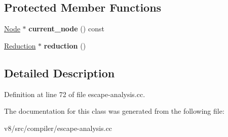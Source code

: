 \subsection*{Protected Member Functions}
\begin{DoxyCompactItemize}
\item 
\mbox{\label{classv8_1_1internal_1_1compiler_1_1ReduceScope_a3d08235d019002a3c80190853746b478}} 
\mbox{\hyperlink{classv8_1_1internal_1_1compiler_1_1Node}{Node}} $\ast$ {\bfseries current\+\_\+node} () const
\item 
\mbox{\label{classv8_1_1internal_1_1compiler_1_1ReduceScope_a9867cc534cf38e5ece449478b47fdda0}} 
\mbox{\hyperlink{classv8_1_1internal_1_1compiler_1_1EffectGraphReducer_1_1Reduction}{Reduction}} $\ast$ {\bfseries reduction} ()
\end{DoxyCompactItemize}


\subsection{Detailed Description}


Definition at line 72 of file escape-\/analysis.\+cc.



The documentation for this class was generated from the following file\+:\begin{DoxyCompactItemize}
\item 
v8/src/compiler/escape-\/analysis.\+cc\end{DoxyCompactItemize}
